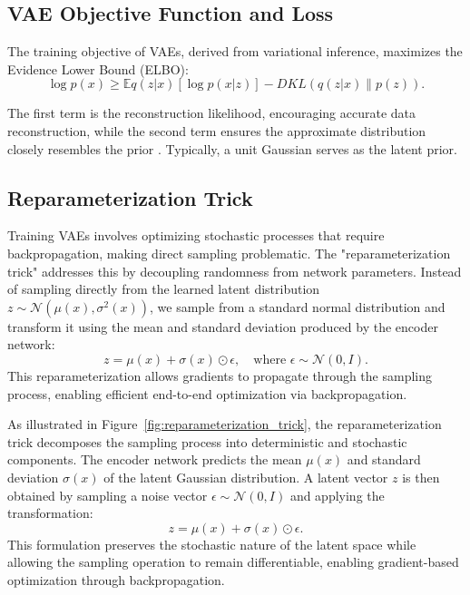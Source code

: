 \subsection{VAE Objective Function and Loss} \label{subsec:VAE Objective Function and Loss}
The training objective of VAEs, derived from variational inference, maximizes the Evidence Lower Bound (ELBO):
\begin{equation}
\log p(x) \geq \mathbb{E}{q(z|x)}[\log p(x|z)] - D{KL}(q(z|x) \parallel p(z)).
\end{equation}

The first term is the reconstruction likelihood, encouraging accurate data reconstruction, while the second term ensures the approximate distribution  closely resembles the prior . Typically, a unit Gaussian  serves as the latent prior.

\subsection{Reparameterization Trick} \label{subsec:reparameterization_trick}
Training VAEs involves optimizing stochastic processes that require backpropagation, making direct sampling problematic. The "reparameterization trick" addresses this by decoupling randomness from network parameters. Instead of sampling directly from the learned latent distribution \( z \sim \mathcal{N}(\mu(x), \sigma^2(x)) \), we sample from a standard normal distribution and transform it using the mean and standard deviation produced by the encoder network:
\begin{equation}
z = \mu(x) + \sigma(x) \odot \epsilon, \quad \text{where } \epsilon \sim \mathcal{N}(0, I).
\end{equation}
This reparameterization allows gradients to propagate through the sampling process, enabling efficient end-to-end optimization via backpropagation.


As illustrated in Figure~\ref{fig:reparameterization_trick}, the reparameterization trick decomposes the sampling process into deterministic and stochastic components. The encoder network predicts the mean \( \mu(x) \) and standard deviation \( \sigma(x) \) of the latent Gaussian distribution. A latent vector \( z \) is then obtained by sampling a noise vector \( \epsilon \sim \mathcal{N}(0, I) \) and applying the transformation:
\[
z = \mu(x) + \sigma(x) \odot \epsilon.
\]
This formulation preserves the stochastic nature of the latent space while allowing the sampling operation to remain differentiable, enabling gradient-based optimization through backpropagation.


